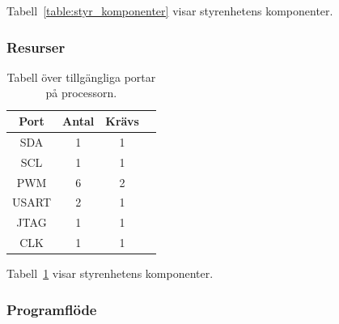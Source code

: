 \documentclass{article}
\begin{document}
Tabell~\ref{table:styr_komponenter} visar styrenhetens komponenter.


\subsubsection{Resurser}
\begin{table}[H]
\centering
\caption{Tabell över tillgängliga portar på processorn.}
\begin{tabular}{ | c | c | c | c |}
\hline
\textbf{Port} & \textbf{Antal} & \textbf{Krävs} \\
\hline
SDA & 1 & 1 \\
\hline
SCL & 1 & 1 \\
\hline
PWM & 6 & 2 \\
\hline
USART & 2 & 1 \\
\hline
JTAG & 1 & 1 \\
\hline
CLK & 1 & 1 \\
\hline
\end{tabular}
\label{table:styr_portar}
\end{table}

Tabell~\ref{table:styr_portar} visar styrenhetens komponenter.

\subsubsection{Programflöde}
\end{document}
